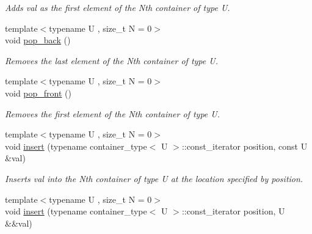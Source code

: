 \begin{DoxyCompactItemize}
\begin{DoxyCompactList}\small\item\em Adds val as the first element of the Nth container of type U. \end{DoxyCompactList}\item 
\hypertarget{classheterogeneous_1_1heterodeque_3_01_t_00_01_types_8_8_8_4_af18d0dd1fddc47727e81231bf702efc6}{}{\footnotesize template$<$typename U , size\+\_\+t N = 0$>$ }\\void \hyperlink{classheterogeneous_1_1heterodeque_3_01_t_00_01_types_8_8_8_4_af18d0dd1fddc47727e81231bf702efc6}{pop\+\_\+back} ()\label{classheterogeneous_1_1heterodeque_3_01_t_00_01_types_8_8_8_4_af18d0dd1fddc47727e81231bf702efc6}

\begin{DoxyCompactList}\small\item\em Removes the last element of the Nth container of type U. \end{DoxyCompactList}\item 
\hypertarget{classheterogeneous_1_1heterodeque_3_01_t_00_01_types_8_8_8_4_a33133b5df06bd8833738a6cdb73e9210}{}{\footnotesize template$<$typename U , size\+\_\+t N = 0$>$ }\\void \hyperlink{classheterogeneous_1_1heterodeque_3_01_t_00_01_types_8_8_8_4_a33133b5df06bd8833738a6cdb73e9210}{pop\+\_\+front} ()\label{classheterogeneous_1_1heterodeque_3_01_t_00_01_types_8_8_8_4_a33133b5df06bd8833738a6cdb73e9210}

\begin{DoxyCompactList}\small\item\em Removes the first element of the Nth container of type U. \end{DoxyCompactList}\item 
\hypertarget{classheterogeneous_1_1heterodeque_3_01_t_00_01_types_8_8_8_4_a55114e919ca645d0a7a1fb9ea31471c1}{}{\footnotesize template$<$typename U , size\+\_\+t N = 0$>$ }\\void \hyperlink{classheterogeneous_1_1heterodeque_3_01_t_00_01_types_8_8_8_4_a55114e919ca645d0a7a1fb9ea31471c1}{insert} (typename container\+\_\+type$<$ U $>$\+::const\+\_\+iterator position, const U \&val)\label{classheterogeneous_1_1heterodeque_3_01_t_00_01_types_8_8_8_4_a55114e919ca645d0a7a1fb9ea31471c1}

\begin{DoxyCompactList}\small\item\em Inserts val into the Nth container of type U at the location specified by position. \end{DoxyCompactList}\item 
\hypertarget{classheterogeneous_1_1heterodeque_3_01_t_00_01_types_8_8_8_4_a8cb374c1401bb07b7d569fad007bf820}{}{\footnotesize template$<$typename U , size\+\_\+t N = 0$>$ }\\void \hyperlink{classheterogeneous_1_1heterodeque_3_01_t_00_01_types_8_8_8_4_a8cb374c1401bb07b7d569fad007bf820}{insert} (typename container\+\_\+type$<$ U $>$\+::const\+\_\+iterator position, U \&\&val)\label{classheterogeneous_1_1heterodeque_3_01_t_00_01_types_8_8_8_4_a8cb374c1401bb07b7d569fad007bf820}


\end{DoxyCompactItemize}
